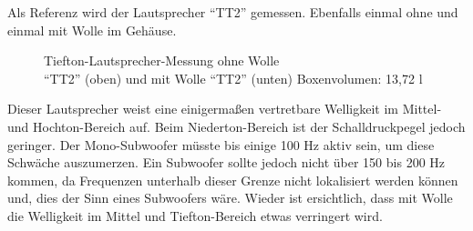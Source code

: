 \newpage
Als Referenz wird der Lautsprecher \enquote{TT2} gemessen. 
Ebenfalls einmal ohne und einmal mit Wolle im Gehäuse.
\begin{figure} [H]
	\centering
	\quad
	\caption{Tiefton-Lautsprecher-Messung ohne Wolle\\ \enquote{TT2} (oben) und mit Wolle \enquote{TT2} (unten) Boxenvolumen: 13,72 l}
	\label{fig:4.2.4.2}
\end{figure}
Dieser Lautsprecher weist eine einigermaßen vertretbare Welligkeit im Mittel- und Hochton-Bereich auf.
Beim Niederton-Bereich ist der Schalldruckpegel jedoch geringer.
Der Mono-Subwoofer müsste bis einige 100 Hz aktiv sein, um diese Schwäche auszumerzen.
Ein Subwoofer sollte jedoch nicht über 150 bis 200 Hz kommen, da Frequenzen unterhalb dieser Grenze nicht lokalisiert werden können und, dies der Sinn eines Subwoofers wäre.
Wieder ist ersichtlich, dass mit Wolle die Welligkeit im Mittel und Tiefton-Bereich etwas verringert wird.

